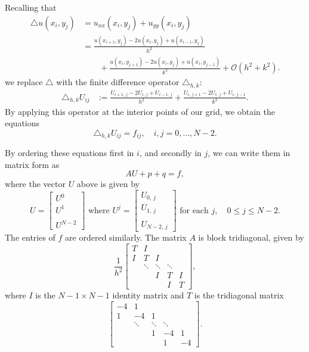 Recalling that 
 \begin{align*}
 \triangle u(x_i,y_j) &= u_{xx}(x_i,y_j) + u_{yy}(x_i,y_j) \\
&= \frac{u(x_{i+1},y_{j}) - 2u(x_{i},y_{j})+ u(x_{i-1},y_{j})}{h^2} \\
 & \qquad{}+ 
 \frac{u(x_{i},y_{j+1}) - 2u(x_{i},y_{j})+ u(x_{i},y_{j-1})}{k^2} + \mathcal{O}(h^2 + k^2).
 \end{align*}
we replace $\triangle $ with the finite difference operator $\triangle_{h,k}$:
 \begin{align*}
 \triangle_{h,k} U_{ij} &:= \frac{U_{i+1,\,j} - 2U_{i,\,j} + U_{i-1,\,j}}{h^2} + \frac{U_{i,\,j+1} - 2U_{i,\,j}+ U_{i,\,j-1}}{k^2}.
 \end{align*}
By applying this operator at the interior points of our grid, we obtain the equations  
\[
\triangle_{h,k} U_{ij} = f_{ij}, \quad i,j = 0,\ldots,N-2.
\]

By ordering these equations first in $i$, and secondly in $j$, we can write them in matrix form as
\[AU + p +  q  = f,\]
where the vector $U$ above is given by 
\[U = \begin{bmatrix} U^0 \\ U^1 \\ \\ U^{N-2} \end{bmatrix} \text{ where } U^j = 
\begin{bmatrix} U_{0,\,j} \\ U_{1,\,j} \\ \\ U_{N-2,\,j} \end{bmatrix} \text{ for each } j,\quad 0\leq j \leq N-2.\]
The entries of $f$ are ordered similarly.
The matrix $A$ is block tridiagonal, given by 
\[\frac{1}{h^2}
\begin{bmatrix}
T & I & &  &\\
I &T & I & &\\
&\ddots  & \ddots & \ddots & \\
&  & I & T & I \\
&  &  & I & T\end{bmatrix},\]
where $I$ is the $N-1\times N-1$ %
identity matrix and $T$ is the tridiagonal matrix
\[\begin{bmatrix}
-4 & 1 & &  &\\
1 &-4 & 1 & &\\
&\ddots  & \ddots & \ddots & \\
&  & 1 & -4 & 1 \\
&  &  & 1 & -4 \end{bmatrix}.\]


